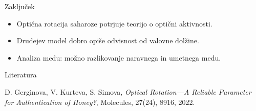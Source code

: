 \documentclass[slovene]{beamer}
\begin{document}
\begin{frame}{Zaključek}
    \begin{itemize}
        \item Optična rotacija saharoze potrjuje teorijo o optični aktivnosti.
        \item Drudejev model dobro opiše odvisnost od valovne dolžine.
        \item Analiza medu: možno razlikovanje naravnega in umetnega medu.
    \end{itemize}
\end{frame}

\begin{frame}{Literatura}
    \footnotesize
    \begin{thebibliography}{9}
        D. Gerginova, V. Kurteva, S. Simova,
        \textit{Optical Rotation—A Reliable Parameter for Authentication of Honey?},
        Molecules, 27(24), 8916, 2022.
    \end{thebibliography}
\end{frame}
\end{document}
